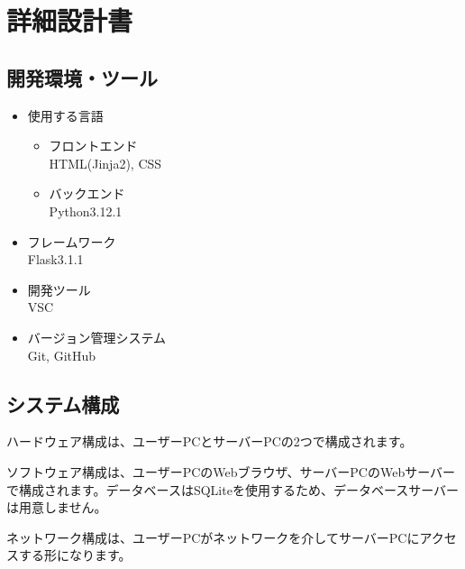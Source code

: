 \documentclass[a4paper, 11pt, titlepage]{jsarticle}
\begin{document}
\section{詳細設計書}

\subsection{開発環境・ツール}
\begin{itemize}
  \item 使用する言語
  \begin{itemize}
    \item フロントエンド\\
    HTML(Jinja2), CSS
    \item バックエンド\\
    Python3.12.1
  \end{itemize}
  \item フレームワーク\\
  Flask3.1.1
  \item 開発ツール\\
  VSC
  \item バージョン管理システム\\
  Git, GitHub
\end{itemize}

\subsection{システム構成}
ハードウェア構成は、ユーザーPCとサーバーPCの2つで構成されます。

ソフトウェア構成は、ユーザーPCのWebブラウザ、サーバーPCのWebサーバーで構成されます。データベースはSQLiteを使用するため、データベースサーバーは用意しません。

ネットワーク構成は、ユーザーPCがネットワークを介してサーバーPCにアクセスする形になります。
\end{document}
